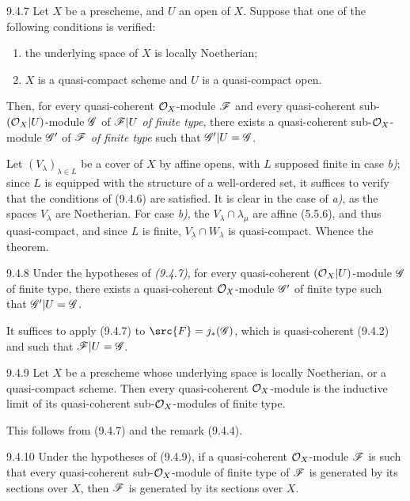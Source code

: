 \documentclass[../main.tex]{subfiles}
\begin{document}
\begin{cx}[Theorem]{9.4.7}
    Let $X$ be a prescheme, and $U$ an open of $X$.
    Suppose that one of the following conditions is verified:
    \begin{enumerate}[label=\normalfont\alph*)]
        \item the underlying space of $X$ is locally Noetherian;
        \item $X$ is a quasi-compact scheme and $U$ is a quasi-compact open.
    \end{enumerate}
    Then, for every quasi-coherent $\mathcal{O}_X$-module $\mathscr{F}$ and every quasi-coherent sub-$(\mathcal{O}_X|U)$-module $\mathscr{G}$ of $\mathscr{F}|U$ \emph{of finite type}, there exists a quasi-coherent sub-$\mathcal{O}_X$-module $\mathscr{G}'$ of $\mathscr{F}$ \emph{of finite type} such that $\mathscr{G}'|U=\mathscr{G}$.
\end{cx}

Let $(V_\lambda)_{\lambda\in L}$ be a cover of $X$ by affine opens, with $L$ supposed finite in case \emph{b)}; since $L$ is equipped with the structure of a well-ordered set, it suffices to verify that the conditions of (9.4.6) are satisfied.
It is clear in the case of \emph{a)}, as the spaces $V_\lambda$ are Noetherian.
For case \emph{b)}, the $V_\lambda\cap\lambda_\mu$ are affine (5.5.6), and thus quasi-compact, and since $L$ is finite, $V_\lambda\cap W_\lambda$ is quasi-compact.
Whence the theorem.

\begin{cx}[Corollary]{9.4.8}
    Under the hypotheses of \emph{(9.4.7)}, for every quasi-coherent $(\mathcal{O}_X|U)$-module $\mathscr{G}$ of finite type, there exists a quasi-coherent $\mathcal{O}_X$-module $\mathscr{G}'$ of finite type such that $\mathscr{G}'|U=\mathscr{G}$.
\end{cx}

It suffices to apply (9.4.7) to $\src{F}=j_*(\scr{G})$, which is quasi-coherent (9.4.2) and such that $\mathscr{F}|U=\mathscr{G}$.

\begin{cx}[Corollary]{9.4.9}
    Let $X$ be a prescheme whose underlying space is locally Noetherian, or a quasi-compact scheme.
    Then every quasi-coherent $\mathcal{O}_X$-module is the inductive limit of its quasi-coherent sub-$\mathcal{O}_X$-modules of finite type.
\end{cx}

This follows from (9.4.7) and the remark (9.4.4).

\begin{cx}[Corollary]{9.4.10}
    Under the hypotheses of (9.4.9), if a quasi-coherent $\mathcal{O}_X$-module $\mathscr{F}$ is such that every quasi-coherent sub-$\mathcal{O}_X$-module of finite type of $\mathscr{F}$ is generated by its sections over $X$, then $\mathscr{F}$ is generated by its sections over $X$.
\end{cx}
\end{document}
